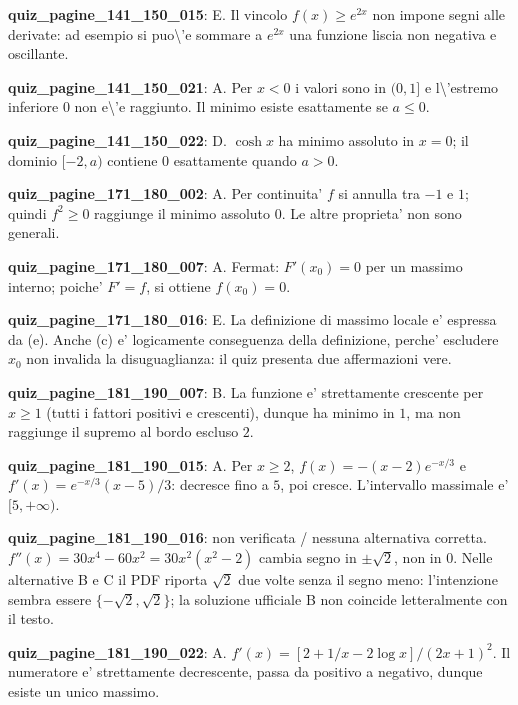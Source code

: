 \documentclass[11pt,a4paper]{article}
\newcounter{quiz}
\begin{document}
\noindent\textbf{quiz\_pagine\_141\_150\_015}: E. Il vincolo $f(x)\geq e^{2x}$ non impone segni alle derivate: ad esempio si puo\textbackslash{}'e sommare a $e^{2x}$ una funzione liscia non negativa e oscillante.\par\medskip
\noindent\textbf{quiz\_pagine\_141\_150\_021}: A. Per $x<0$ i valori sono in $(0,1]$ e l\textbackslash{}'estremo inferiore $0$ non e\textbackslash{}'e raggiunto. Il minimo esiste esattamente se $a\leq0$.\par\medskip
\noindent\textbf{quiz\_pagine\_141\_150\_022}: D. $\cosh x$ ha minimo assoluto in $x=0$; il dominio $[-2,a)$ contiene $0$ esattamente quando $a>0$.\par\medskip
\noindent\textbf{quiz\_pagine\_171\_180\_002}: A. Per continuita' $f$ si annulla tra $-1$ e $1$; quindi $f^2\geq0$ raggiunge il minimo assoluto $0$. Le altre proprieta' non sono generali.\par\medskip
\noindent\textbf{quiz\_pagine\_171\_180\_007}: A. Fermat: $F'(x_0)=0$ per un massimo interno; poiche' $F'=f$, si ottiene $f(x_0)=0$.\par\medskip
\noindent\textbf{quiz\_pagine\_171\_180\_016}: E. La definizione di massimo locale e' espressa da (e). Anche (c) e' logicamente conseguenza della definizione, perche' escludere $x_0$ non invalida la disuguaglianza: il quiz presenta due affermazioni vere.\par\medskip
\noindent\textbf{quiz\_pagine\_181\_190\_007}: B. La funzione e' strettamente crescente per $x\geq1$ (tutti i fattori positivi e crescenti), dunque ha minimo in $1$, ma non raggiunge il supremo al bordo escluso $2$.\par\medskip
\noindent\textbf{quiz\_pagine\_181\_190\_015}: A. Per $x\geq2$, $f(x)=-(x-2)e^{-x/3}$ e $f'(x)=e^{-x/3}(x-5)/3$: decresce fino a $5$, poi cresce. L'intervallo massimale e' $[5,+\infty)$.\par\medskip
\noindent\textbf{quiz\_pagine\_181\_190\_016}: non verificata / nessuna alternativa corretta. $f''(x)=30x^4-60x^2=30x^2(x^2-2)$ cambia segno in $\pm\sqrt2$, non in $0$. Nelle alternative B e C il PDF riporta $\sqrt2$ due volte senza il segno meno: l'intenzione sembra essere $\{-\sqrt2,\sqrt2\}$; la soluzione ufficiale B non coincide letteralmente con il testo.\par\medskip
\noindent\textbf{quiz\_pagine\_181\_190\_022}: A. $f'(x)=[2+1/x-2\log x]/(2x+1)^2$. Il numeratore e' strettamente decrescente, passa da positivo a negativo, dunque esiste un unico massimo.\par\medskip
\end{document}
